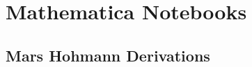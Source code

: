 \chapter{Mathematica Notebooks} \label{apx:mathematica}



\section{Mars Hohmann Derivations}\label{apx:mars-hohmann-derivations}
